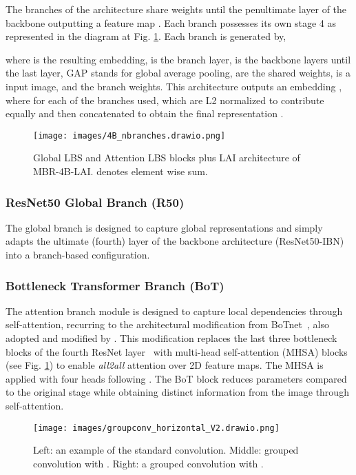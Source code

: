 \documentclass[letterpaper, 10pt, conference]{ieeeconf}
\begin{document}
The  branches of the architecture share weights until the penultimate layer of the backbone  outputting a feature map .  Each branch possesses its own stage 4  as represented in the diagram at Fig. \ref{fig:diag_b_branches}. Each branch is generated by,

where  is the  resulting embedding,  is the  branch layer,  is the backbone layers until the last layer, GAP stands for global average pooling,  are the shared weights,  is a input image, and  the  branch weights. 
This architecture outputs an embedding , where  for each of the  branches used, which are L2 normalized to contribute equally and then concatenated to obtain the final representation .

\begin{figure}[tb]
\centerline{{\texttt{[image: images/4B\_nbranches.drawio.png]}}}
\caption{Global LBS and Attention LBS blocks plus LAI architecture of MBR-4B-LAI.  denotes element wise sum.} \label{fig:diag_b_branches}
\end{figure}

\subsubsection{ResNet50 Global Branch (R50)}
The global branch is designed to capture global representations and simply adapts the ultimate (fourth) layer of the backbone architecture (ResNet50-IBN) into a branch-based configuration.

\subsubsection{Bottleneck Transformer Branch (BoT)}
The attention branch module is designed to capture local dependencies through self-attention, recurring to the architectural modification from BoTnet~\cite{srinivas2021bottleneck}, also adopted and modified by \cite{article}. This modification replaces the last three bottleneck blocks of the fourth ResNet layer~\cite{he2016deep} with multi-head self-attention (MHSA) blocks (see Fig. \ref{fig:diag_b_branches}) to enable \textit{all2all} attention over 2D feature maps. The MHSA is applied with four heads following \cite{srinivas2021bottleneck}. 
The BoT block reduces parameters compared to the original stage while obtaining distinct information from the image through self-attention. 

\begin{figure*}[htb!]
\centerline{{\texttt{[image: images/groupconv\_horizontal\_V2.drawio.png]}}}
\caption{Left: an example of the standard convolution. Middle: grouped convolution with . Right: a grouped convolution with .}
\label{fig:groupconv}
\end{figure*}
\end{document}
